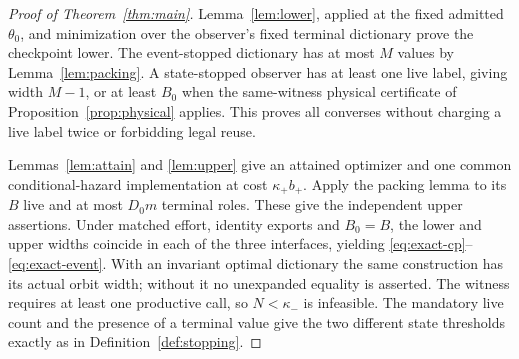 \begin{proof}[Proof of Theorem~\ref{thm:main}]
Lemma~\ref{lem:lower}, applied at the fixed admitted $\theta_0$, and minimization over the observer's fixed terminal dictionary prove the checkpoint lower. The event-stopped dictionary has at most $M$ values by Lemma~\ref{lem:packing}. A state-stopped observer has at least one live label, giving width $M-1$, or at least $B_0$ when the same-witness physical certificate of Proposition~\ref{prop:physical} applies. This proves all converses without charging a live label twice or forbidding legal reuse.

Lemmas~\ref{lem:attain} and \ref{lem:upper} give an attained optimizer and one common conditional-hazard implementation at cost $\kappa_+b_+$. Apply the packing lemma to its $B$ live and at most $D_0m$ terminal roles. These give the independent upper assertions. Under matched effort, identity exports and $B_0=B$, the lower and upper widths coincide in each of the three interfaces, yielding \eqref{eq:exact-cp}--\eqref{eq:exact-event}. With an invariant optimal dictionary the same construction has its actual orbit width; without it no unexpanded equality is asserted. The witness requires at least one productive call, so $N<\kappa_-$ is infeasible. The mandatory live count and the presence of a terminal value give the two different state thresholds exactly as in Definition~\ref{def:stopping}.
\end{proof}
